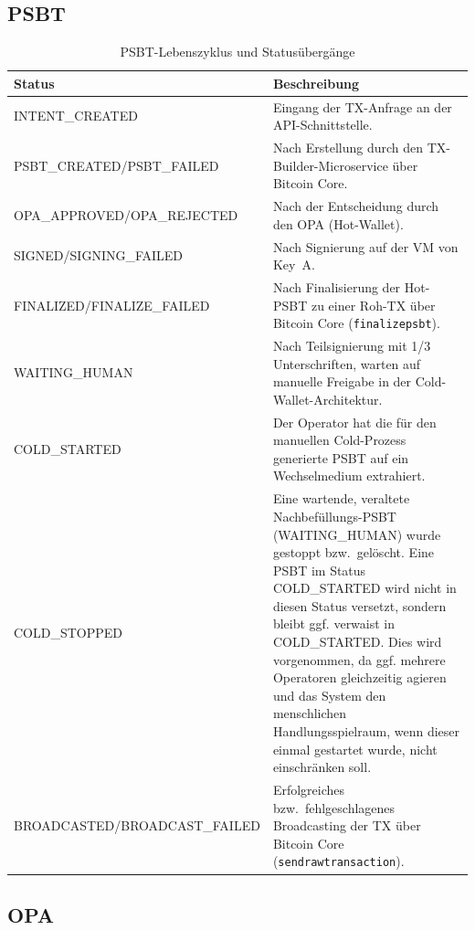 \subsection{PSBT}

\begin{table}[H]
\centering
\footnotesize
\renewcommand{\arraystretch}{1.3}
\begin{tabularx}{\linewidth}{@{} >{\ttfamily\RaggedRight}p{5.0cm} >{\RaggedRight}X @{}}
\toprule
\textbf{\normalfont Status} & \textbf{Beschreibung} \\
\midrule
INTENT\_CREATED & Eingang der \ac{TX}-Anfrage an der \ac{API}-Schnittstelle. \\
\addlinespace
PSBT\_CREATED/PSBT\_FAILED & Nach Erstellung durch den TX-Builder-Microservice über Bitcoin Core. \\
\addlinespace
OPA\_APPROVED/OPA\_REJECTED & Nach der Entscheidung durch den \ac{OPA} (Hot-Wallet). \\
\addlinespace
SIGNED/SIGNING\_FAILED & Nach Signierung auf der \ac{VM} von Key~A. \\
\addlinespace
FINALIZED/FINALIZE\_FAILED & Nach Finalisierung der Hot-\ac{PSBT} zu einer Roh-\ac{TX} über Bitcoin Core (\texttt{finalizepsbt}). \\
\addlinespace
WAITING\_HUMAN & Nach Teilsignierung mit 1/3 Unterschriften, warten auf manuelle Freigabe in der Cold-Wallet-Architektur. \\
\addlinespace
COLD\_STARTED & Der Operator hat die für den manuellen Cold-Prozess generierte \ac{PSBT} auf ein Wechselmedium extrahiert. \\
\addlinespace
COLD\_STOPPED & Eine wartende, veraltete Nachbefüllungs-\ac{PSBT} (WAITING\_HUMAN) wurde gestoppt bzw.\ gelöscht. Eine \ac{PSBT} im Status COLD\_STARTED wird nicht in diesen Status versetzt, sondern bleibt ggf. verwaist in COLD\_STARTED. Dies wird vorgenommen, da ggf. mehrere Operatoren gleichzeitig agieren und das System den menschlichen Handlungsspielraum, wenn dieser einmal gestartet wurde, nicht einschränken soll. \\
\addlinespace
BROADCASTED/BROADCAST\_FAILED & Erfolgreiches bzw.\ fehlgeschlagenes Broadcasting der \ac{TX} über Bitcoin Core (\texttt{sendrawtransaction}). \\
\bottomrule
\end{tabularx}
\caption{\acs{PSBT}-Lebenszyklus und Statusübergänge}
\label{tab:psbt_states}
\end{table}


\subsection{\ac{OPA}}

